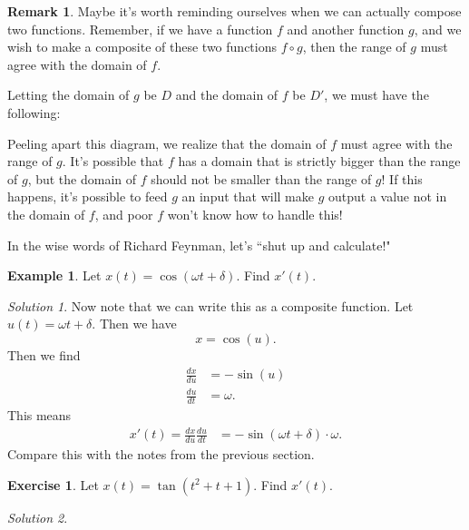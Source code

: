 \documentclass[leqno]{article}
\theoremstyle{definition}
\newtheorem{remark}{Remark}[section]
\newtheorem{example}{Example}[section]
\newtheorem{exercise}{Exercise}[section]
\theoremstyle{remark}
\newtheorem*{solution}{Solution}
\theoremstyle{theorem}
\begin{document}
\begin{remark}
Maybe it's worth reminding ourselves when we can actually compose two functions.  Remember, if we have a function $f$ and another function $g$, and we wish to make a composite of these two functions $f\circ g$, then the range of $g$ must agree with the domain of $f$. 

Letting the domain of $g$ be $D$ and the domain of $f$ be $D'$, we must have the following:
\begin{center}
\end{center}
Peeling apart this diagram, we realize that the domain of $f$ must agree with the range of $g$.  It's possible that $f$ has a domain that is strictly bigger than the range of $g$, but the domain of $f$ should not be smaller than the range of $g$! If this happens, it's possible to feed $g$ an input that will make $g$ output a value not in the domain of $f$, and poor $f$ won't know how to handle this!
\end{remark}

In the wise words of Richard Feynman, let's ``shut up and calculate!"

\begin{example}
Let $x(t)=\cos (\omega t+\delta)$.  Find $x'(t)$. 
\begin{solution}
Now note that we can write this as a composite function.  Let $u(t)=\omega t + \delta$.  Then we have 
\[
x=\cos (u).
\]
Then we find
\begin{align*}
\frac{dx}{du}&=-\sin (u)\\
\frac{du}{dt}&=\omega.
\end{align*}
This means
\begin{align*}
x'(t)=\frac{dx}{du}\frac{du}{dt}&= -\sin(\omega t + \delta)\cdot \omega. 
\end{align*}
Compare this with the notes from the previous section.
\end{solution} 
\end{example}

\begin{exercise}
Let $x(t)=\tan (t^2+t+1)$. Find $x'(t)$.
\begin{solution}~
\vspace*{6cm}
\end{solution}
\end{exercise}
\end{document}
